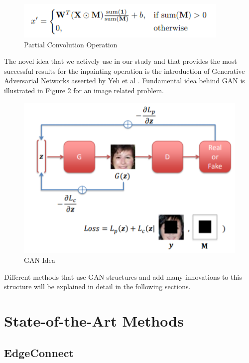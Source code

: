 \begin{figure}[h]
    \centering
    \includegraphics[scale=1]{figures/chapter4/partial-conv.png}
    \caption{Partial Convolution Operation}
    \label{fig:partial-convl}
\end{figure}

The novel idea that we actively use in our study and that provides the most successful results for the inpainting operation is the introduction of Generative Adversarial Networks asserted by Yeh et al \cite{semantic_inpainting_geneative}. Fundamental idea behind GAN is illustrated in Figure \ref{fig:gan-idedal} for an image related problem.

\begin{figure}[h]
    \centering
    \includegraphics[scale=0.7]{figures/chapter4/GANinpainting.PNG}
    \caption{GAN Idea}
    \label{fig:gan-idedal}
\end{figure}

Different methods that use GAN structures and add many innovations to this structure will be explained in detail in the following sections.

\newpage
\section{State-of-the-Art Methods}

\subsection{EdgeConnect}


